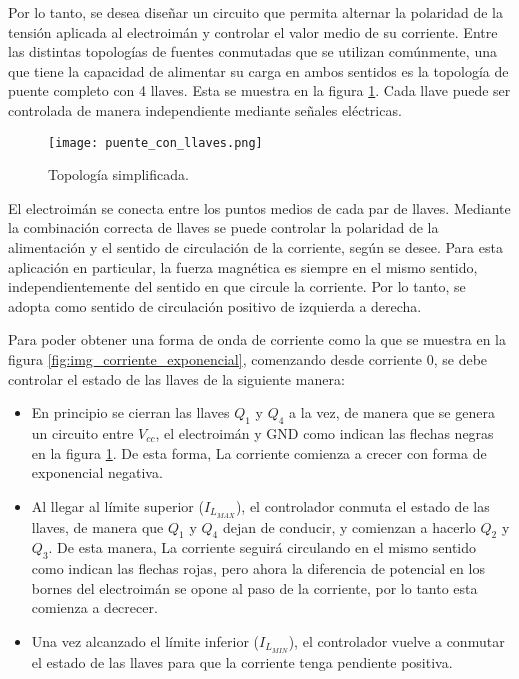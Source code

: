 Por lo tanto, se desea diseñar un circuito que permita alternar la polaridad de la tensión aplicada al electroimán y controlar el valor medio de su corriente. Entre las distintas topologías de fuentes conmutadas que se utilizan comúnmente, una que tiene la capacidad de alimentar su carga en ambos sentidos es la topología de puente completo con 4 llaves. Esta se muestra en la figura \ref{fig:img_topologia_simplificada}. Cada llave puede ser controlada de manera independiente mediante señales eléctricas.

\begin{figure}[H]
	\centering
	\texttt{[image: puente\_con\_llaves.png]}
	\caption{Topología simplificada.}
	\label{fig:img_topologia_simplificada}
\end{figure} 


El electroimán se conecta entre los puntos medios de cada par de llaves. Mediante la combinación correcta de llaves se puede controlar la polaridad de la alimentación y el sentido de circulación de la corriente, según se desee. Para esta aplicación en particular, la fuerza magnética es siempre en el mismo sentido, independientemente del sentido en que circule la corriente. Por lo tanto, se adopta como sentido de circulación positivo de izquierda a derecha.

Para poder obtener una forma de onda de corriente como la que se muestra en la figura \ref{fig:img_corriente_exponencial}, comenzando desde corriente 0, se debe controlar el estado de las llaves de la siguiente manera:

\begin{itemize}
	\item En principio se cierran las llaves $Q_1$ y $Q_4$ a la vez, de manera que se genera un circuito entre $V_{cc}$, el electroimán y GND como indican las flechas negras en la figura \ref{fig:img_topologia_simplificada}. De esta forma, La corriente comienza a crecer con forma de exponencial negativa. 
	\item Al llegar al límite superior ($I_{L_{MAX}}$), el controlador conmuta el estado de las llaves, de manera que $Q_1$ y $Q_4$ dejan de conducir, y comienzan a hacerlo $Q_2$ y $Q_3$. De esta manera, La corriente seguirá circulando en el mismo sentido como indican las flechas rojas, pero ahora la diferencia de potencial en los bornes del electroimán se opone al paso de la corriente, por lo tanto esta comienza a decrecer.
	\item Una vez alcanzado el límite inferior ($I_{L_{MIN}}$), el controlador vuelve a conmutar el estado de las llaves para que la corriente tenga pendiente positiva.
\end{itemize}

